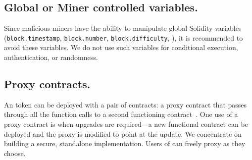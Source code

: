 \subsection{Global or Miner controlled variables.}

Since malicious miners have the ability to manipulate global Solidity variables (\eg \texttt{block.timestamp}, \texttt{block.number}, \texttt{block.difficulty}, \etc), it is recommended to avoid these variables. We do not use such variables for conditional execution, authentication, or randomness.

\subsection{Proxy contracts.}

An \erc token can be deployed with a pair of contracts: a proxy contract that passes through all the function calls to a second functioning \erc contract~\cite{ProxyContract,ProxyPatterns}. One use of a proxy contract is when upgrades are required---a new functional contract can be deployed and the proxy is modified to point at the update. We concentrate on building a secure, standalone implementation. Users of \sys can freely proxy \sys as they choose. 





